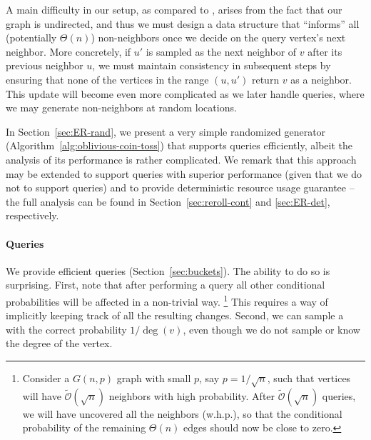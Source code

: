 A main difficulty in our setup, as compared to \cite{reut},
arises from the fact that our graph is undirected, and thus
we must design a data structure that ``informs'' all (potentially $\Theta(n)$) non-neighbors once we decide on the query vertex's next neighbor.
More concretely, if $u'$ is sampled as the next neighbor of $v$ after its previous neighbor $u$,
we must maintain consistency in subsequent steps
by ensuring that none of the vertices in the range $(u,u')$
return $v$ as a neighbor. This update will become even more complicated as we later handle  queries, where we may generate non-neighbors at random locations.

In Section~\ref{sec:ER-rand}, we present a very simple randomized generator
(Algorithm~\ref{alg:oblivious-coin-toss}) that supports 
queries efficiently, albeit the analysis of its performance is rather complicated.
We remark that this approach may be extended to support  queries with superior performance (given that we do not to support  queries) and to provide deterministic resource usage guarantee -- the full analysis can be found in Section~\ref{sec:reroll-cont} and \ref{sec:ER-det}, respectively.

\paragraph*{ Queries}
\label{par:random_neighbor_queries}
We provide efficient  queries (Section~\ref{sec:buckets}).
The ability to do so is surprising.  First, note that after performing a  query
all other conditional probabilities will be affected in a non-trivial way.
\footnote{Consider a $G(n,p)$ graph with small $p$, say $p = 1/\sqrt n$,
such that vertices will have $\tilde{\mathcal{O}}(\sqrt n)$ neighbors with high probability.
After $\tilde{\mathcal{O}}(\sqrt n)$  queries,
we will have uncovered all the neighbors (w.h.p.),
so that the conditional probability of the remaining
$\Theta(n)$ edges should now be close to zero.}
This requires a way of implicitly keeping track of all the resulting changes.
Second, we can sample a  with the correct probability $1/\deg(v)$,
even though we do not sample or know the degree of the vertex.

